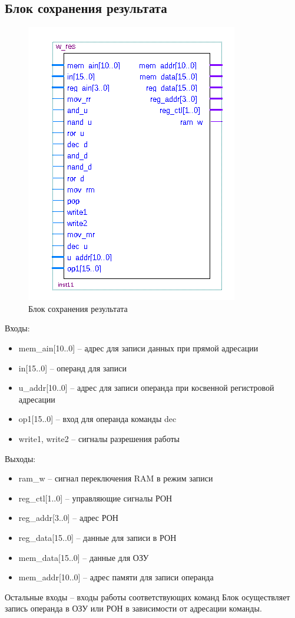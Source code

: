 \subsection{Блок сохранения результата}

\begin{figure}[ht]{\textwidth}
\centering
    \includegraphics[scale=0.8]{wbc}
    \caption{Блок сохранения результата}
\end{figure}
Входы:
\begin{itemize}
    \item mem\_ain[10..0] -- адрес для записи данных при прямой адресации
    \item in[15..0] -- операнд для записи
    \item u\_addr[10..0] -- адрес для записи операнда при косвенной регистровой адресации
    \item op1[15..0] -- вход для операнда команды dec
    \item write1, write2 -- сигналы разрешения работы
\end{itemize}
Выходы:
\begin{itemize}
    \item ram\_w -- сигнал переключения RAM в режим записи
    \item reg\_ctl[1..0] -- управляющие сигналы РОН
    \item reg\_addr[3..0] -- адрес РОН
    \item reg\_data[15..0] -- данные для записи в РОН
    \item mem\_data[15..0] -- данные для ОЗУ
    \item mem\_addr[10..0] -- адрес памяти для записи операнда
\end{itemize}
Остальные входы -- входы работы соответствующих команд
Блок осуществляет запись операнда в ОЗУ или РОН в зависимости от адресации команды.

